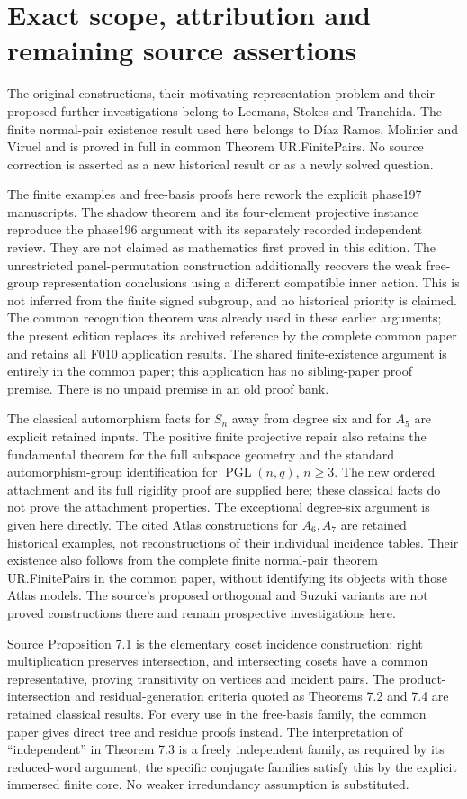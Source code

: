 \section{Exact scope, attribution and remaining source assertions}
The original constructions, their motivating representation problem and
their proposed further investigations belong to Leemans, Stokes and
Tranchida. The finite normal-pair existence result used here belongs to
D\'iaz Ramos, Molinier and Viruel and is proved in full in common
Theorem UR.FinitePairs. No source correction is asserted as a new historical
result or as a newly solved question.

The finite examples and free-basis proofs here rework the explicit
phase197 manuscripts. The shadow theorem and its four-element projective
instance reproduce the phase196 argument with its separately recorded
independent review. They are not claimed as mathematics first proved
in this edition. The unrestricted panel-permutation construction additionally recovers the
weak free-group representation conclusions using a different compatible
inner action. This is not inferred from the finite signed subgroup, and
no historical priority is claimed.
The common recognition theorem was already used in
these earlier arguments; the present edition replaces its archived
reference by the complete common paper and retains all F010 application
results. The shared finite-existence argument is entirely in the common
paper; this application has no sibling-paper proof premise. There is no
unpaid premise in an old proof bank.

The classical automorphism facts for $S_n$ away from degree six and for
$A_5$ are explicit retained inputs. The positive finite projective repair
also retains the fundamental theorem for the full subspace geometry and
the standard automorphism-group identification for $\operatorname{PGL}(n,q)$,
$n\ge3$. The new ordered attachment and its full rigidity proof are supplied
here; these classical facts do not prove the attachment properties. The exceptional degree-six argument
is given here directly. The cited Atlas constructions for $A_6,A_7$ are
retained historical examples, not reconstructions of their individual
incidence tables. Their existence also follows from the complete finite
normal-pair theorem UR.FinitePairs in the common paper, without identifying
its objects with those Atlas
models. The source's proposed orthogonal and Suzuki variants are not
proved constructions there and remain prospective investigations here.

Source Proposition 7.1 is the elementary coset incidence construction:
right multiplication preserves intersection, and intersecting cosets
have a common representative, proving transitivity on vertices and
incident pairs. The product-intersection and residual-generation criteria
quoted as Theorems 7.2 and 7.4 are retained classical results. For every
use in the free-basis family, the common paper gives direct tree and
residue proofs instead. The interpretation of ``independent'' in
Theorem 7.3 is a freely independent family, as required by its reduced-word
argument; the specific conjugate families satisfy this by the explicit
immersed finite core. No weaker irredundancy assumption is substituted.

